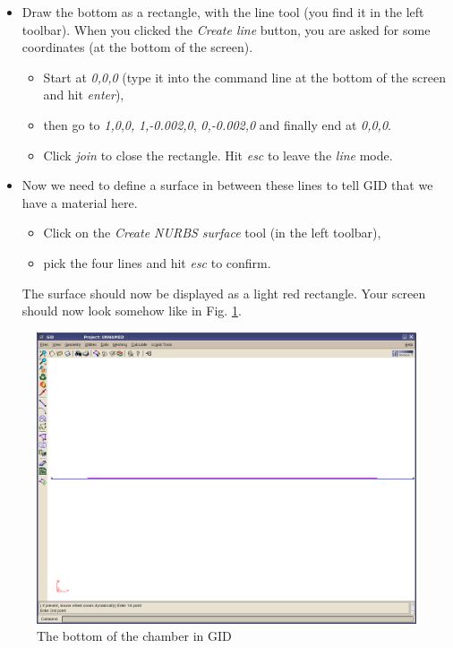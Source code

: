 \begin{itemize}
\item Draw the bottom as a rectangle, with the line tool (you find it in
the left toolbar). When you clicked the \emph{Create line} button,
you are asked for some coordinates (at the bottom of the screen). 

\begin{itemize}
\item Start at \emph{0,0,0} (type it into the command line at the bottom
of the screen and hit \emph{enter}), 
\item then go to \emph{1,0},\emph{0,} \emph{1,-0.002,0}, \emph{0,-0.002,0}
and finally end at \emph{0,0,0}. 
\item Click \emph{join} to close the rectangle. Hit \emph{esc} to leave
the \emph{line} mode.
\end{itemize}
\item Now we need to define a surface in between these lines to tell GID
that we have a material here. 

\begin{itemize}
\item Click on the \emph{Create NURBS surface} tool (in the left toolbar), 
\item pick the four lines and hit \emph{esc} to confirm. 
\end{itemize}
The surface should now be displayed as a light red rectangle. Your
screen should now look somehow like in Fig. \ref{tut_fsi:3.1}.

\end{itemize}
%
\begin{figure}[h]
\includegraphics[width=1\columnwidth,keepaspectratio]{Bilder/structure_01}


\caption{\label{tut_fsi:3.1} The bottom of the chamber in GID}
\end{figure}


